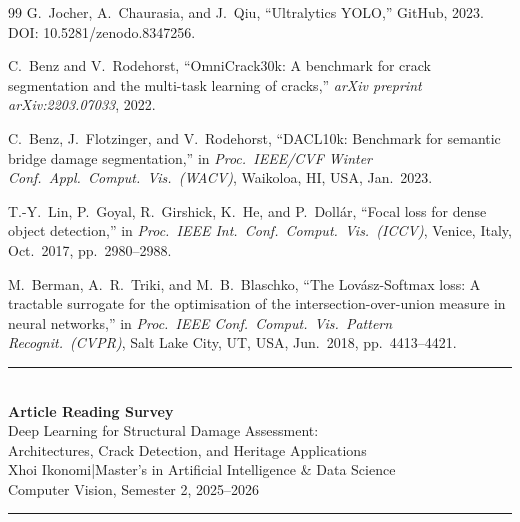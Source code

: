 \documentclass[12pt,a4paper]{article}
\begin{document}
\begin{thebibliography}{99}
G.~Jocher, A.~Chaurasia, and J.~Qiu,
``Ultralytics YOLO,''
GitHub, 2023.
DOI: 10.5281/zenodo.8347256.

C.~Benz and V.~Rodehorst,
``OmniCrack30k: A benchmark for crack segmentation and the multi-task learning of cracks,''
\textit{arXiv preprint arXiv:2203.07033}, 2022.

C.~Benz, J.~Flotzinger, and V.~Rodehorst,
``DACL10k: Benchmark for semantic bridge damage segmentation,''
in \textit{Proc.\ IEEE/CVF Winter Conf.\ Appl.\ Comput.\ Vis.\ (WACV)},
Waikoloa, HI, USA, Jan.\ 2023.

T.-Y.~Lin, P.~Goyal, R.~Girshick, K.~He, and P.~Doll{\'a}r,
``Focal loss for dense object detection,''
in \textit{Proc.\ IEEE Int.\ Conf.\ Comput.\ Vis.\ (ICCV)},
Venice, Italy, Oct.\ 2017, pp.\ 2980--2988.

M.~Berman, A.~R.~Triki, and M.~B.~Blaschko,
``The Lov\'{a}sz-Softmax loss: A tractable surrogate for the optimisation of the intersection-over-union measure in neural networks,''
in \textit{Proc.\ IEEE Conf.\ Comput.\ Vis.\ Pattern Recognit.\ (CVPR)},
Salt Lake City, UT, USA, Jun.\ 2018, pp.\ 4413--4421.

\end{thebibliography}

\clearpage
{}
{}

\begin{center}
  \rule{\linewidth}{0.4pt}\\[1em]
  {\LARGE\bfseries Article Reading Survey}\\[0.6em]
  {\large Deep Learning for Structural Damage Assessment:\\[0.3em]
  Architectures, Crack Detection, and Heritage Applications}\\[0.8em]
  {\normalsize Xhoi Ikonomi\quad|\quad Master's in Artificial Intelligence \& Data Science\\[0.2em]
  Computer Vision, Semester 2, 2025--2026}\\[1em]
  \rule{\linewidth}{0.4pt}
\end{center}

\vspace{1.5em}

\end{document}
